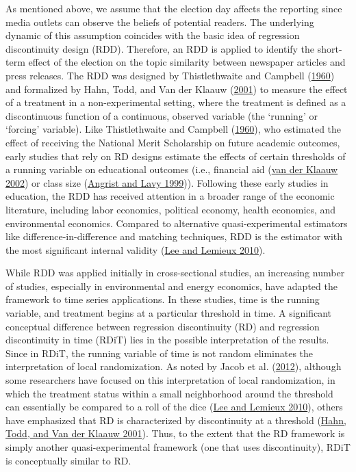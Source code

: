 \documentclass[
  12pt,
]{article}
\begin{document}
As mentioned above, we assume that the election day affects the
reporting since media outlets can observe the beliefs of potential
readers. The underlying dynamic of this assumption coincides with the
basic idea of regression discontinuity design (RDD). Therefore, an RDD
is applied to identify the short-term effect of the election on the
topic similarity between newspaper articles and press releases. The RDD
was designed by Thistlethwaite and Campbell
(\protect\hyperlink{ref-thistlethwaite_regressiondiscontinuity_1960}{1960})
and formalized by Hahn, Todd, and Van der Klaauw
(\protect\hyperlink{ref-hahn_identification_2001}{2001}) to measure the
effect of a treatment in a non-experimental setting, where the treatment
is defined as a discontinuous function of a continuous, observed
variable (the `running' or `forcing' variable). Like Thistlethwaite and
Campbell
(\protect\hyperlink{ref-thistlethwaite_regressiondiscontinuity_1960}{1960}),
who estimated the effect of receiving the National Merit Scholarship on
future academic outcomes, early studies that rely on RD designs estimate
the effects of certain thresholds of a running variable on educational
outcomes (i.e., financial aid
(\protect\hyperlink{ref-vanderklaauw_estimating_2002}{van der Klaauw
2002}) or class size (\protect\hyperlink{ref-angrist_using_1999}{Angrist
and Lavy 1999})). Following these early studies in education, the RDD
has received attention in a broader range of the economic literature,
including labor economics, political economy, health economics, and
environmental economics. Compared to alternative quasi-experimental
estimators like difference-in-difference and matching techniques, RDD is
the estimator with the most significant internal validity
(\protect\hyperlink{ref-lee_regression_2010}{Lee and Lemieux 2010}).

While RDD was applied initially in cross-sectional studies, an
increasing number of studies, especially in environmental and energy
economics, have adapted the framework to time series applications. In
these studies, time is the running variable, and treatment begins at a
particular threshold in time. A significant conceptual difference
between regression discontinuity (RD) and regression discontinuity in
time (RDiT) lies in the possible interpretation of the results. Since in
RDiT, the running variable of time is not random eliminates the
interpretation of local randomization. As noted by Jacob et al.
(\protect\hyperlink{ref-jacob_practical_2012}{2012}), although some
researchers have focused on this interpretation of local randomization,
in which the treatment status within a small neighborhood around the
threshold can essentially be compared to a roll of the dice
(\protect\hyperlink{ref-lee_regression_2010}{Lee and Lemieux 2010}),
others have emphasized that RD is characterized by discontinuity at a
threshold (\protect\hyperlink{ref-hahn_identification_2001}{Hahn, Todd,
and Van der Klaauw 2001}). Thus, to the extent that the RD framework is
simply another quasi-experimental framework (one that uses
discontinuity), RDiT is conceptually similar to RD.
\end{document}
